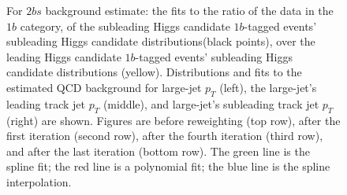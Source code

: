 \begin{figure}[htbp!]
\begin{center}
\caption{For $2bs$ background estimate: the fits to the ratio of the data in the $1b$ category, of the subleading Higgs candidate $1b$-tagged events' subleading Higgs candidate distributions(black points), over the leading Higgs candidate $1b$-tagged events' subleading Higgs candidate distributions (yellow). Distributions and fits to the estimated QCD background for large-\R jet $p_{T}$ (left), the large-\R jet's leading track jet $p_T$ (middle), and large-\R jet's subleading track jet $p_T$ (right) are shown.  Figures are before reweighting (top row), after the first iteration (second row), after the fourth iteration (third row), and after the last iteration (bottom row). The green line is the spline fit; the red line is a polynomial fit; the blue line is the spline interpolation.}
\label{fig:rw-2bs-lead}
\end{center}
\end{figure}


